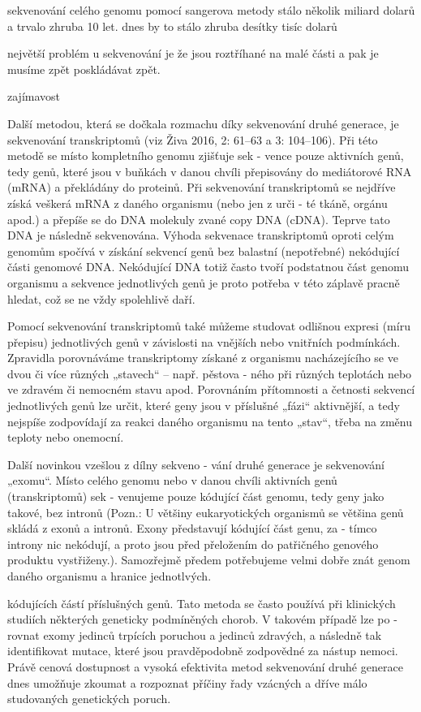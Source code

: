 \documentclass[czech,DP]{thesiskiv}
\begin{document}
sekvenování celého genomu pomocí sangerova metody stálo několik miliard dolarů a trvalo zhruba 10 let.
dnes by to stálo zhruba desítky tisíc dolarů 

největší problém u sekvenování je že jsou roztříhané na malé části a pak je musíme zpět poskládávat zpět.


zajímavost

Další metodou, která se dočkala rozmachu díky sekvenování druhé generace, je
sekvenování transkriptomů (viz Živa 2016,
2: 61–63 a 3: 104–106). Při této metodě se
místo kompletního genomu zjišťuje sek -
vence pouze aktivních genů, tedy genů,
které jsou v buňkách v danou chvíli přepisovány do mediátorové RNA (mRNA)
a překládány do proteinů. Při sekvenování
transkriptomů se nejdříve získá veškerá
mRNA z daného organismu (nebo jen z urči -
té tkáně, orgánu apod.) a přepíše se do DNA
molekuly zvané copy DNA (cDNA). Teprve
tato DNA je následně sekvenována. Výhoda sekvenace transkriptomů oproti celým
genomům spočívá v získání sekvencí genů
bez balastní (nepotřebné) nekódující části
genomové DNA. Nekódující DNA totiž často tvoří podstatnou část genomu organismu a sekvence jednotlivých genů je proto
potřeba v této záplavě pracně hledat, což
se ne vždy spolehlivě daří. 


Pomocí sekvenování transkriptomů také
můžeme studovat odlišnou expresi (míru
přepisu) jednotlivých genů v závislosti na
vnějších nebo vnitřních podmínkách. Zpravidla porovnáváme transkriptomy získané z organismu nacházejícího se ve dvou
či více různých „stavech“ – např. pěstova -
ného při různých teplotách nebo ve zdravém či nemocném stavu apod. Porovnáním
přítomnosti a četnosti sekvencí jednotlivých genů lze určit, které geny jsou v příslušné „fázi“ aktivnější, a tedy nejspíše
zodpovídají za reakci daného organismu
na tento „stav“, třeba na změnu teploty
nebo onemocní.


Další novinkou vzešlou z dílny sekveno -
vání druhé generace je sekvenování „exomu“. Místo celého genomu nebo v danou
chvíli aktivních genů (transkriptomů) sek -
venujeme pouze kódující část genomu,
tedy geny jako takové, bez intronů (Pozn.:
U většiny eukaryotických organismů se
většina genů skládá z exonů a intronů.
Exony představují kódující část genu, za -
tímco introny nic nekódují, a proto jsou
před přeložením do patřičného genového
produktu vystřiženy.). Samozřejmě předem potřebujeme velmi dobře znát genom
daného organismu a hranice jednotlvých.


kódujících částí příslušných genů. Tato
metoda se často používá při klinických
studiích některých geneticky podmíněných chorob. V takovém případě lze po -
rovnat exomy jedinců trpících poruchou
a jedinců zdravých, a následně tak identifikovat mutace, které jsou pravděpodobně zodpovědné za nástup nemoci. Právě
cenová dostupnost a vysoká efektivita
metod sekvenování druhé generace dnes
umožňuje zkoumat a rozpoznat příčiny
řady vzácných a dříve málo studovaných
genetických poruch.
\end{document}
